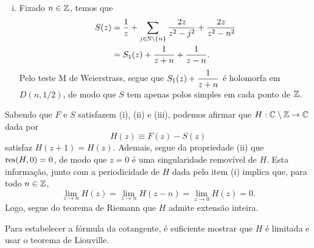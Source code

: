 \begin{exemplo}
\begin{enumerate}[(i)]
            \item Fixado $n\in\mathbb{Z}$, temos que
            \begin{align*}
                S(z) &= \frac{1}{z} + \sum_{j\in\mathbb{N}\setminus\{n\}} \frac{2z}{z^2 - j^2}
                + \frac{2z}{z^2 - n^2} \\
                &= S_1(z) + \frac{1}{z+n} + \frac{1}{z-n}.
            \end{align*}
            Pelo teste M de Weierstrass, segue que $S_1(z) + \displaystyle{\frac{1}{z+n}}$
            é holomorfa em $D(n, 1/2)$, de modo que $S$ tem apenas polos simples
            em cada ponto de $\mathbb{Z}$.
        \end{enumerate}
        Sabendo que $F$ e $S$ satisfazem (i), (ii) e (iii), podemos afirmar que
        $H:\mathbb{C}\setminus\mathbb{Z}\to\mathbb{C}$ dada por
        \begin{equation*}
            H(z) \equiv F(z) - S(z)
        \end{equation*}
        satisfaz $H(z+1) = H(z)$. Ademais, segue da propriedade (ii) que
        $\operatorname{res}(H,0) = 0$, de modo que $z=0$ é uma singularidade removível de $H$.
        Esta informação, junto com a periodicidade de $H$ dada pelo item (i)
        implica que, para todo $n\in\mathbb{Z}$,
        \begin{equation*}
            \lim_{z\to n} H(z) = \lim_{z\to n} H(z-n) = \lim_{z\to 0} H(z) = 0.
        \end{equation*}
        Logo, segue do teorema de Riemann que $H$ admite extensão inteira.
        
        Para estabelecer a fórmula da cotangente, é suficiente mostrar que
        $H$ é limitada e usar o teorema de Liouville.
        

\end{exemplo}
